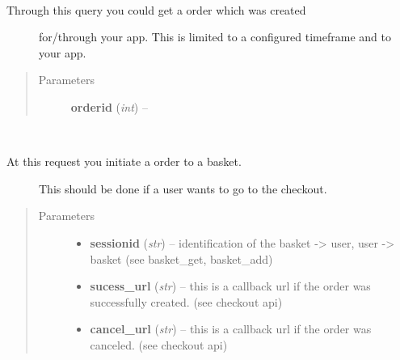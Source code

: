 \documentclass[letterpaper,10pt,english]{sphinxmanual}
\begin{document}
\begin{fulllineitems}
\begin{fulllineitems}
\label{collins:collins.Collins.getorder}~\begin{description}
\item[{Through this query you could get a order which was created }] \leavevmode
for/through your app. This is limited to a configured 
timeframe and to your app.

\end{description}
\begin{quote}\begin{description}
\item[{Parameters}] \leavevmode
\textbf{orderid} (\emph{int}) -- 

\end{description}\end{quote}

\end{fulllineitems}


\begin{fulllineitems}
\label{collins:collins.Collins.initiateorder}~\begin{description}
\item[{At this request you initiate a order to a basket.}] \leavevmode
This should be done if a user wants to go to the checkout.

\end{description}
\begin{quote}\begin{description}
\item[{Parameters}] \leavevmode\begin{itemize}
\item {} 
\textbf{sessionid} (\emph{str}) -- identification of the basket -\textgreater{} user, user -\textgreater{} basket (see basket\_get, basket\_add)

\item {} 
\textbf{sucess\_url} (\emph{str}) -- this is a callback url if the order was successfully created. (see checkout api)

\item {} 
\textbf{cancel\_url} (\emph{str}) -- this is a callback url if the order was canceled. (see checkout api)


\end{itemize}
\end{description}
\end{quote}
\end{fulllineitems}
\end{fulllineitems}
\end{document}
